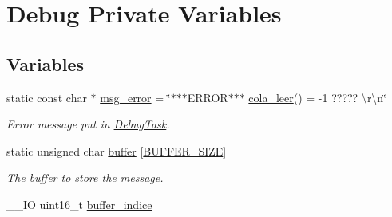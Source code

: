 \hypertarget{group___debug___private___variables}{}\section{Debug Private Variables}
\label{group___debug___private___variables}
\subsection*{Variables}
\begin{DoxyCompactItemize}
\item 
static const char $\ast$ \hyperlink{group___debug___private___variables_ga57ad017acd4535fe089f54ed903b3e9e}{msg\+\_\+error} = \char`\"{}$\ast$$\ast$$\ast$E\+R\+R\+OR$\ast$$\ast$$\ast$ \hyperlink{group___cola___exported___functions___group2_ga12fe948f259d8c9d7a390a76c416b55c}{cola\+\_\+leer}() = -\/1 ????? \textbackslash{}r\textbackslash{}n\char`\"{}\hypertarget{group___debug___private___variables_ga57ad017acd4535fe089f54ed903b3e9e}{}\label{group___debug___private___variables_ga57ad017acd4535fe089f54ed903b3e9e}

\begin{DoxyCompactList}\small\item\em Error message put in \hyperlink{group___debug___exported___functions___group2_ga0e7fca846e34e06a1f62249fe8a30a44}{Debug\+Task}. \end{DoxyCompactList}\item 
static unsigned char \hyperlink{group___debug___private___variables_gacab2203504e72e5e674d3174e0bd7d5e}{buffer} \mbox{[}\hyperlink{group___debug___private___define_ga6b20d41d6252e9871430c242cb1a56e7}{B\+U\+F\+F\+E\+R\+\_\+\+S\+I\+ZE}\mbox{]}\hypertarget{group___debug___private___variables_gacab2203504e72e5e674d3174e0bd7d5e}{}\label{group___debug___private___variables_gacab2203504e72e5e674d3174e0bd7d5e}

\begin{DoxyCompactList}\small\item\em The \hyperlink{group___debug___private___variables_gacab2203504e72e5e674d3174e0bd7d5e}{buffer} to store the message. \end{DoxyCompactList}\item 
\+\_\+\+\_\+\+IO uint16\+\_\+t \hyperlink{group___debug___private___variables_gacd3f15a092421e9fa47f50d4f95f212b}{buffer\+\_\+indice}\hypertarget{group___debug___private___variables_gacd3f15a092421e9fa47f50d4f95f212b}{}\label{group___debug___private___variables_gacd3f15a092421e9fa47f50d4f95f212b}


\end{DoxyCompactItemize}
